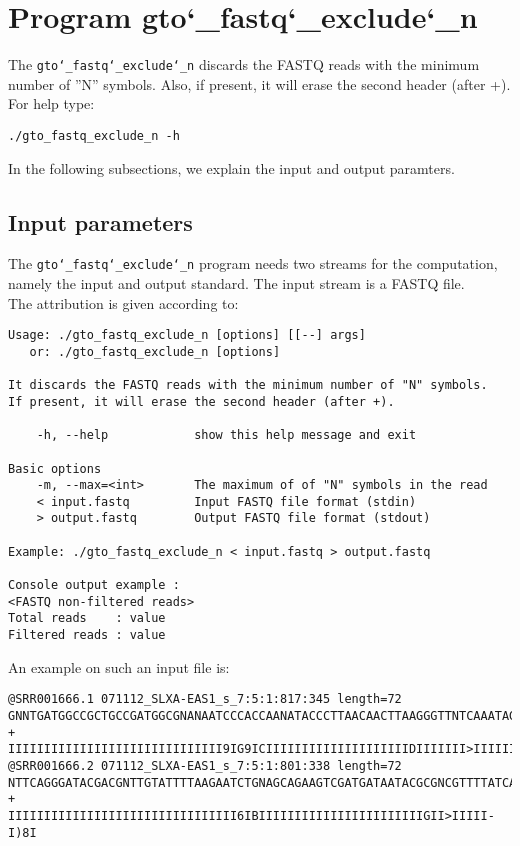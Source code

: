 \section{Program gto\char`_fastq\char`_exclude\char`_n}
The \texttt{gto\char`_fastq\char`_exclude\char`_n} discards the FASTQ reads with the minimum number of ''N'' symbols. Also, if present, it will erase the second header (after +).\\
For help type:
\begin{lstlisting}
./gto_fastq_exclude_n -h
\end{lstlisting}
In the following subsections, we explain the input and output paramters.

\subsection*{Input parameters}

The \texttt{gto\char`_fastq\char`_exclude\char`_n} program needs two streams for the computation,
namely the input and output standard. The input stream is a FASTQ file.\\
The attribution is given according to:
\begin{lstlisting}
Usage: ./gto_fastq_exclude_n [options] [[--] args]
   or: ./gto_fastq_exclude_n [options]

It discards the FASTQ reads with the minimum number of "N" symbols. 
If present, it will erase the second header (after +).

    -h, --help            show this help message and exit

Basic options
    -m, --max=<int>       The maximum of of "N" symbols in the read
    < input.fastq         Input FASTQ file format (stdin)
    > output.fastq        Output FASTQ file format (stdout)

Example: ./gto_fastq_exclude_n < input.fastq > output.fastq

Console output example :
<FASTQ non-filtered reads>
Total reads    : value
Filtered reads : value
\end{lstlisting}
An example on such an input file is:
\begin{lstlisting}
@SRR001666.1 071112_SLXA-EAS1_s_7:5:1:817:345 length=72
GNNTGATGGCCGCTGCCGATGGCGNANAATCCCACCAANATACCCTTAACAACTTAAGGGTTNTCAAATAGA
+
IIIIIIIIIIIIIIIIIIIIIIIIIIIIII9IG9ICIIIIIIIIIIIIIIIIIIIIDIIIIIII>IIIIII/
@SRR001666.2 071112_SLXA-EAS1_s_7:5:1:801:338 length=72
NTTCAGGGATACGACGNTTGTATTTTAAGAATCTGNAGCAGAAGTCGATGATAATACGCGNCGTTTTATCAN
+
IIIIIIIIIIIIIIIIIIIIIIIIIIIIIIII6IBIIIIIIIIIIIIIIIIIIIIIIIGII>IIIII-I)8I
\end{lstlisting}

